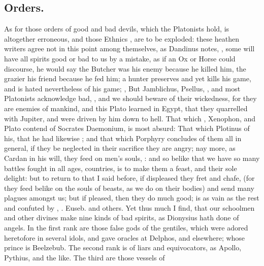 \subsection{Orders.}
As for those orders of good and bad devils, which the Platonists hold, is
altogether erroneous, and those Ethnics , are to be
exploded: these heathen writers agree not in this point among themselves, as
Dandinus notes, , some
will have all spirits good or bad to us by a mistake, as if an Ox or Horse
could discourse, he would say the Butcher was his enemy because he killed him,
the grazier his friend because he fed him; a hunter preserves and yet kills his
game, and is hated nevertheless of his game; , \etc{} But Jamblichus, Psellus, \Plutarch{}, and most Platonists
acknowledge bad, , and we should beware of
their wickedness, for they are enemies of mankind, and this Plato learned in
Egypt, that they quarrelled with Jupiter, and were driven by him down to hell.
That which \Apuleius, Xenophon, and
Plato contend of Socrates Daemonium, is most absurd: That which Plotinus of
his, that he had likewise ; and that which Porphyry
concludes of them all in general, if they be neglected in their sacrifice they
are angry; nay more, as Cardan in his  will,
they feed on men's souls, : and so belike that we
have so many battles fought in all ages, countries, is to make them a feast,
and their sole delight: but to return to that I said before, if displeased they
fret and chafe, (for they feed belike on the souls of beasts, as we do on their
bodies) and send many plagues amongst us; but if pleased, then they do much
good; is as vain as the rest and confuted by \Austin{}, . Euseb. 
and others. Yet thus much I find, that our schoolmen and other
divines make nine kinds of bad spirits, as Dionysius hath
done of angels. In the first rank are those false gods of the gentiles, which
were adored heretofore in several idols, and gave oracles at Delphos, and
elsewhere; whose prince is Beelzebub. The second rank is of liars and
equivocators, as Apollo, Pythius, and the like. The third are those vessels of
